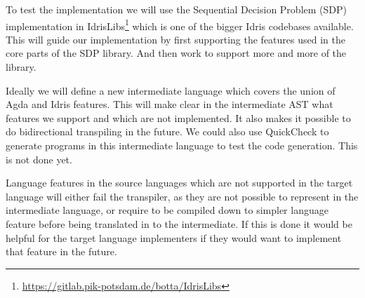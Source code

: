 \documentclass[parskip=half]{scrartcl}
\begin{document}






To test the implementation we will use the Sequential Decision Problem (SDP)
implementation in
IdrisLibs\footnote{\url{https://gitlab.pik-potsdam.de/botta/IdrisLibs}} which
is one of the bigger Idris codebases available. This will guide our
implementation by first supporting the features used in the core parts of the
SDP library. And then work to support more and more of the library.




Ideally we will define a new intermediate language which covers the union of
Agda and Idris features.  This will make clear in the intermediate AST what
features we support and which are not implemented. It also makes it possible to
do bidirectional transpiling in the future.  We could also use QuickCheck to
generate programs in this intermediate language to test the code generation.
This is not done yet.

Language features in the source languages which are not supported in the target
language will either fail the transpiler, as they are not possible to represent
in the intermediate language, or require to be compiled down to simpler
language feature before being translated in to the intermediate. If this is
done it would be helpful for the target language implementers if they would
want to implement that feature in the future.
\end{document}
